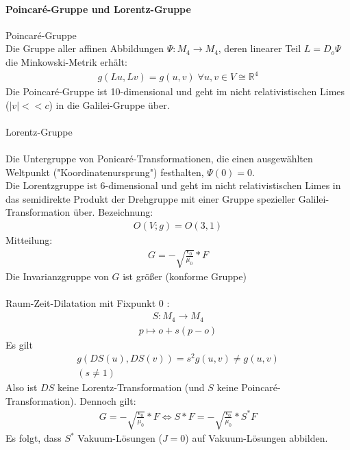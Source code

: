 \documentclass[10pt,a4paper]{article}
\begin{document}
\paragraph{Poincaré-Gruppe und Lorentz-Gruppe} $\,$ \\
Poincaré-Gruppe \\
Die Gruppe aller affinen Abbildungen $\Psi : M_4\longrightarrow M_4 $, deren linearer Teil $ L= D_o \Psi $ die Minkowski-Metrik erhält:
\begin{align}
g(Lu,Lv) = g(u,v) \;\forall u,v \in V \cong \mathbb{R}^4
\end{align}
Die Poincaré-Gruppe ist 10-dimensional und geht im nicht relativistischen Limes ($ \vert v \vert << c $) in die Galilei-Gruppe über.\\
\\
Lorentz-Gruppe \\
\\
Die Untergruppe von Ponicaré-Transformationen, die einen ausgewählten Weltpunkt ("Koordinatenursprung") festhalten, $\Psi (0)=0 $. \\
Die Lorentzgruppe ist 6-dimensional und geht im nicht relativistischen Limes in das semidirekte Produkt der Drehgruppe mit einer Gruppe spezieller Galilei-Transformation über. Bezeichnung:
\begin{align}
O(V;g)=O(3,1)
\end{align}
Mitteilung:
\begin{align}
G=-\sqrt{\frac{\epsilon_0}{\mu_0}}*F
\end{align}
Die Invarianzgruppe von $G$ ist größer (konforme Gruppe)\\
\\
Raum-Zeit-Dilatation mit Fixpunkt $0$ :
\begin{align}
S: M_4 \longrightarrow M_4
\end{align}
\begin{align}
p \longmapsto o+s(p-o)
\end{align}
Es gilt
\begin{align}
g(DS(u), DS(v))=s^2g(u,v) \neq g(u,v)\\
(s \neq 1)
\end{align}
Also ist $DS$ keine Lorentz-Transformation (und $S$ keine Poincaré-Transformation). Dennoch gilt:
\begin{align}
G = -\sqrt{\frac{\epsilon_0}{\mu_0}}*F \Leftrightarrow S*F= - \sqrt{\frac{\epsilon_0}{\mu_0}}* S^* F
\end{align}
Es folgt, dass $S^*$ Vakuum-Lösungen ($J=0$) auf Vakuum-Lösungen abbilden.
\end{document}
